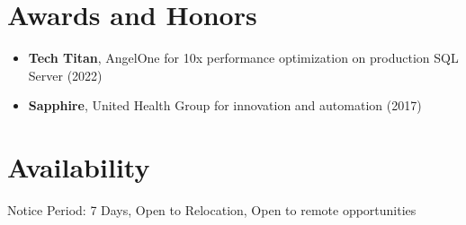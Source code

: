 \documentclass[10pt,a4paper]{article}
\begin{document}
\section{Awards and Honors}
\begin{itemize}
  \item \textbf{Tech Titan}, AngelOne for 10x performance optimization on production SQL Server (2022)
  \item \textbf{Sapphire}, United Health Group for innovation and automation (2017)
\end{itemize}
\section{Availability}
Notice Period: 7 Days, Open to Relocation, Open to remote opportunities
\end{document}

